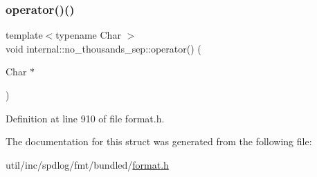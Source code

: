 \subsubsection{\texorpdfstring{operator()()}{operator()()}}
{\footnotesize\ttfamily template$<$typename Char $>$ \\
void internal\+::no\+\_\+thousands\+\_\+sep\+::operator() (\begin{DoxyParamCaption}\item[{Char $\ast$}]{ }\end{DoxyParamCaption})\hspace{0.3cm}{\ttfamily [inline]}}



Definition at line 910 of file format.\+h.



The documentation for this struct was generated from the following file\+:\begin{DoxyCompactItemize}
\item 
util/inc/spdlog/fmt/bundled/\hyperlink{format_8h}{format.\+h}\end{DoxyCompactItemize}
